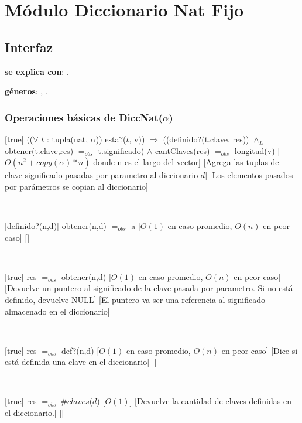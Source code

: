 \section{Módulo Diccionario Nat Fijo}

\subsection{Interfaz}

\textbf{se explica con}: .

\textbf{géneros}: , .

\subsubsection{Operaciones básicas de DiccNat($\alpha$)}

[true]
{(($\forall$ $t$ : tupla(nat, $\alpha$)) esta?($t$, v)) $\Rightarrow$ ((definido?(t.clave, res))
	$\land_L$ obtener(t.clave,res) $=_{obs}$ t.significado) $\land$ cantClaves(res) $=_{obs}$ longitud(v)}
[$O(n^2 + copy(\alpha) * n)$ donde n es el largo del vector]
[Agrega las tuplas de clave-significado pasadas por parametro al diccionario $d$]
[Los elementos pasados por parámetros se copian al diccionario]

~

[definido?(n,d)]
{obtener(n,d) $=_{obs}$ a}
[$O(1)$ en caso promedio, $O(n)$ en peor caso]
[]

~

[true]
{res $=_{obs}$ obtener(n,d)}
[$O(1)$ en caso promedio, $O(n)$ en peor caso]
[Devuelve un puntero al significado de la clave pasada por parametro. Si no está definido, devuelve NULL]
[El puntero va ser una referencia al significado almacenado en el diccionario]

~

[true]
{res $=_{obs}$ def?(n,d)}
[$O(1)$ en caso promedio, $O(n)$ en peor caso]
[Dice si está definida una clave en el diccionario]
[]

~

[true]
{res $=_{obs} \ \# claves$($d$)}
[$O(1)$]
[Devuelve la cantidad de claves definidas en el diccionario.]
[]

